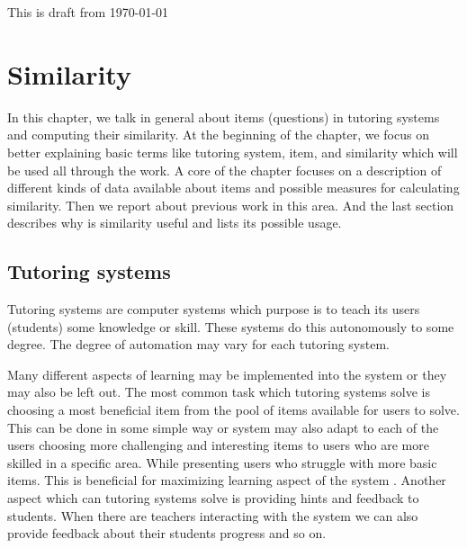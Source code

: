 \documentclass[
  digital, %
  table,   %
  nolof,     %
  nolot,     %
  nocover,
  color,
  final, %
]{fithesis3}
\begin{document}
This is draft from \today %

\chapter{Similarity}



In this chapter, we talk in general about items (questions) in tutoring systems and computing their similarity. At the beginning of the chapter, we focus on better explaining basic terms like tutoring system, item, and similarity which will be used all through the work. A core of the chapter focuses on a description of different kinds of data available about items and possible measures for calculating similarity. Then we report about previous work in this area. And the last section describes why is similarity useful and lists its possible usage.


\section{Tutoring systems}\label{tutoring-systems}

Tutoring systems are computer systems which purpose is to teach its users (students) some knowledge or skill. These systems do this autonomously to some degree. The degree of automation may vary for each tutoring system.


Many different aspects of learning may be implemented into the system or they may also be left out. The most common task which tutoring systems solve is choosing a most beneficial item from the pool of items available for users to solve. This can be done in some simple way or system may also adapt to each of the users choosing more challenging and interesting items to users who are more skilled in a specific area. While presenting users who struggle with more basic items. This is beneficial for maximizing learning aspect of the system \cite{papouvsek2015impact}. Another aspect which can tutoring systems solve is providing hints and feedback to students. When there are teachers interacting with the system we can also provide feedback about their students progress and so on.

\end{document}
